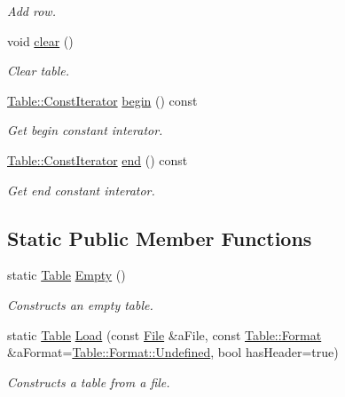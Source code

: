 \begin{DoxyCompactItemize}
\begin{DoxyCompactList}\small\item\em Add row. \end{DoxyCompactList}\item 
void \hyperlink{classlibrary_1_1core_1_1ctnr_1_1_table_a82b89b7d22f40518054f6d507660e8b5}{clear} ()
\begin{DoxyCompactList}\small\item\em Clear table. \end{DoxyCompactList}\item 
\hyperlink{classlibrary_1_1core_1_1ctnr_1_1_table_a7fa78ad4e7e8d27ceab0bff51ab84fc3}{Table\+::\+Const\+Iterator} \hyperlink{classlibrary_1_1core_1_1ctnr_1_1_table_ad9a420d9759797e8e8d9142da502a6c8}{begin} () const
\begin{DoxyCompactList}\small\item\em Get begin constant interator. \end{DoxyCompactList}\item 
\hyperlink{classlibrary_1_1core_1_1ctnr_1_1_table_a7fa78ad4e7e8d27ceab0bff51ab84fc3}{Table\+::\+Const\+Iterator} \hyperlink{classlibrary_1_1core_1_1ctnr_1_1_table_af1aadfb47df33ffa4f611f571d52bd89}{end} () const
\begin{DoxyCompactList}\small\item\em Get end constant interator. \end{DoxyCompactList}\end{DoxyCompactItemize}
\subsection*{Static Public Member Functions}
\begin{DoxyCompactItemize}
\item 
static \hyperlink{classlibrary_1_1core_1_1ctnr_1_1_table}{Table} \hyperlink{classlibrary_1_1core_1_1ctnr_1_1_table_ada8d9997351d5aea25ae8e563eedeb1c}{Empty} ()
\begin{DoxyCompactList}\small\item\em Constructs an empty table. \end{DoxyCompactList}\item 
static \hyperlink{classlibrary_1_1core_1_1ctnr_1_1_table}{Table} \hyperlink{classlibrary_1_1core_1_1ctnr_1_1_table_a423b5a739e3ed0127bc14572042c158e}{Load} (const \hyperlink{classlibrary_1_1core_1_1fs_1_1_file}{File} \&a\+File, const \hyperlink{classlibrary_1_1core_1_1ctnr_1_1_table_ab1d81689432c3a6bc960d33db1e11a4c}{Table\+::\+Format} \&a\+Format=\hyperlink{classlibrary_1_1core_1_1ctnr_1_1_table_ab1d81689432c3a6bc960d33db1e11a4caec0fc0100c4fc1ce4eea230c3dc10360}{Table\+::\+Format\+::\+Undefined}, bool has\+Header=true)
\begin{DoxyCompactList}\small\item\em Constructs a table from a file. \end{DoxyCompactList}\end{DoxyCompactItemize}

